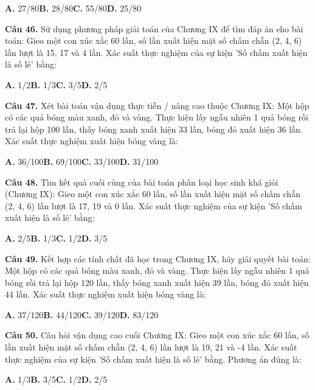 \documentclass[11pt,a4paper]{article}
\begin{document}
\hspace*{1.5em}\textbf{A.} 27/80\quad\quad \textbf{B.} 28/80\quad\quad \textbf{C.} 55/80\quad\quad \textbf{D.} 25/80\par\vspace{2pt}
\textbf{\color{primary} Câu 46.} Sử dụng phương pháp giải toán của Chương IX để tìm đáp án cho bài toán: Gieo một con xúc xắc 60 lần, số lần xuất hiện mặt số chấm chẵn (2, 4, 6) lần lượt là 15, 17 và 4 lần. Xác suất thực nghiệm của sự kiện 'Số chấm xuất hiện là số lẻ' bằng:\par
\hspace*{1.5em}\textbf{A.} 1/2\quad\quad \textbf{B.} 1/3\quad\quad \textbf{C.} 3/5\quad\quad \textbf{D.} 2/5\par\vspace{2pt}
\textbf{\color{primary} Câu 47.} Xét bài toán vận dụng thực tiễn / nâng cao thuộc Chương IX: Một hộp có các quả bóng màu xanh, đỏ và vàng. Thực hiện lấy ngẫu nhiên 1 quả bóng rồi trả lại hộp 100 lần, thấy bóng xanh xuất hiện 33 lần, bóng đỏ xuất hiện 36 lần. Xác suất thực nghiệm xuất hiện bóng vàng là:\par
\hspace*{1.5em}\textbf{A.} 36/100\quad\quad \textbf{B.} 69/100\quad\quad \textbf{C.} 33/100\quad\quad \textbf{D.} 31/100\par\vspace{2pt}
\textbf{\color{primary} Câu 48.} Tìm kết quả cuối cùng của bài toán phân loại học sinh khá giỏi (Chương IX): Gieo một con xúc xắc 60 lần, số lần xuất hiện mặt số chấm chẵn (2, 4, 6) lần lượt là 17, 19 và 0 lần. Xác suất thực nghiệm của sự kiện 'Số chấm xuất hiện là số lẻ' bằng:\par
\hspace*{1.5em}\textbf{A.} 2/5\quad\quad \textbf{B.} 1/3\quad\quad \textbf{C.} 1/2\quad\quad \textbf{D.} 3/5\par\vspace{2pt}
\textbf{\color{primary} Câu 49.} Kết hợp các tính chất đã học trong Chương IX, hãy giải quyết bài toán: Một hộp có các quả bóng màu xanh, đỏ và vàng. Thực hiện lấy ngẫu nhiên 1 quả bóng rồi trả lại hộp 120 lần, thấy bóng xanh xuất hiện 39 lần, bóng đỏ xuất hiện 44 lần. Xác suất thực nghiệm xuất hiện bóng vàng là:\par
\hspace*{1.5em}\textbf{A.} 37/120\quad\quad \textbf{B.} 44/120\quad\quad \textbf{C.} 39/120\quad\quad \textbf{D.} 83/120\par\vspace{2pt}
\textbf{\color{primary} Câu 50.} Câu hỏi vận dụng cao cuối Chương IX: Gieo một con xúc xắc 60 lần, số lần xuất hiện mặt số chấm chẵn (2, 4, 6) lần lượt là 19, 21 và -4 lần. Xác suất thực nghiệm của sự kiện 'Số chấm xuất hiện là số lẻ' bằng. Phương án đúng là:\par
\hspace*{1.5em}\textbf{A.} 1/3\quad\quad \textbf{B.} 3/5\quad\quad \textbf{C.} 1/2\quad\quad \textbf{D.} 2/5\par\vspace{2pt}
\end{document}
